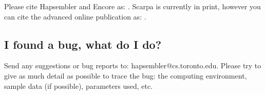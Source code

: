 \documentclass[12pt,a4paper]{report}
\begin{document}
Please cite Hapsembler and Encore as: \cite{donmez11}. Scarpa is currently in print, however you can cite the advanced online publication as: \cite{donmez12}.

\subsection{I found a bug, what do I do?}

Send any suggestions or bug reports to: hapsembler@cs.toronto.edu. Please try to give as much detail as possible to trace the bug: the computing environment, sample data (if possible), parameters used, etc.



\end{document}

